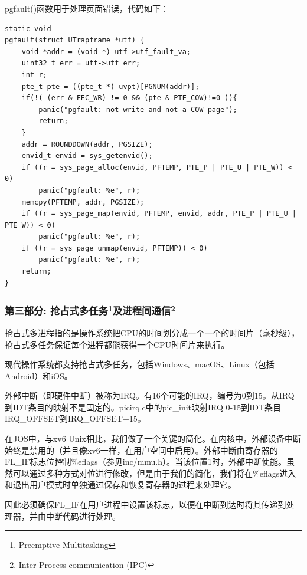 \begin{ExerciseList}
pgfault()函数用于处理页面错误，代码如下：

\begin{verbatim}
static void
pgfault(struct UTrapframe *utf) {
    void *addr = (void *) utf->utf_fault_va;
    uint32_t err = utf->utf_err;
    int r;
    pte_t pte = ((pte_t *) uvpt)[PGNUM(addr)];
    if(!( (err & FEC_WR) != 0 && (pte & PTE_COW)!=0 )){
        panic("pgfault: not write and not a COW page");
        return;
    }
    addr = ROUNDDOWN(addr, PGSIZE);
    envid_t envid = sys_getenvid();
    if ((r = sys_page_alloc(envid, PFTEMP, PTE_P | PTE_U | PTE_W)) < 0)
        panic("pgfault: %e", r);
    memcpy(PFTEMP, addr, PGSIZE);
    if ((r = sys_page_map(envid, PFTEMP, envid, addr, PTE_P | PTE_U | PTE_W)) < 0)
        panic("pgfault: %e", r);
    if ((r = sys_page_unmap(envid, PFTEMP)) < 0)
        panic("pgfault: %e", r);
    return;
}
\end{verbatim}

\subsubsection[第三部分: 抢占式多任务及进程间通信]{第三部分: 抢占式多任务\footnote{Preemptive Multitasking}及进程间通信\footnote{Inter-Process communication (IPC)}}

抢占式多进程指的是操作系统把CPU的时间划分成一个一个的时间片（毫秒级），抢占式多任务保证每个进程都能获得一个CPU时间片来执行。

现代操作系统都支持抢占式多任务，包括Windows、macOS、Linux（包括Android）和iOS。

外部中断（即硬件中断）被称为IRQ。有16个可能的IRQ，编号为0到15。从IRQ到IDT条目的映射不是固定的。picirq.c中的pic\_init映射IRQ 0-15到IDT条目IRQ\_OFFSET到IRQ\_OFFSET+15。

在JOS中，与xv6 Unix相比，我们做了一个关键的简化。在内核中，外部设备中断始终是禁用的（并且像xv6一样，在用户空间中启用）。外部中断由寄存器的FL\_IF标志位控制\%eflags（参见inc/mmu.h）。当该位置1时，外部中断使能。虽然可以通过多种方式对位进行修改，但是由于我们的简化，我们将在\%eflags进入和退出用户模式时单独通过保存和恢复寄存器的过程来处理它。

因此必须确保FL\_IF在用户进程中设置该标志，以便在中断到达时将其传递到处理器，并由中断代码进行处理。



\end{ExerciseList}
